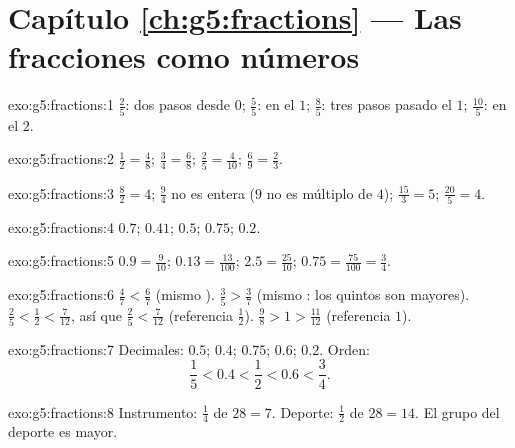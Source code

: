 \section*{Capítulo \ref{ch:g5:fractions} --- Las fracciones como números}

\begin{solution}{exo:g5:fractions:1}
$\frac25$: dos pasos desde $0$; $\frac55$: en el $1$; $\frac85$: tres
pasos pasado el $1$; $\frac{10}{5}$: en el $2$.
\end{solution}

\begin{solution}{exo:g5:fractions:2}
$\frac12 = \frac48$; \quad $\frac34 = \frac68$; \quad
$\frac25 = \frac{4}{10}$; \quad $\frac69 = \frac23$.
\end{solution}

\begin{solution}{exo:g5:fractions:3}
$\frac82 = 4$; \quad $\frac94$ no es entera ($9$ no es múltiplo
de $4$); \quad $\frac{15}{3} = 5$; \quad $\frac{20}{5} = 4$.
\end{solution}

\begin{solution}{exo:g5:fractions:4}
$0.7$; \quad $0.41$; \quad $0.5$; \quad $0.75$; \quad $0.2$.
\end{solution}

\begin{solution}{exo:g5:fractions:5}
$0.9 = \frac{9}{10}$; \quad $0.13 = \frac{13}{100}$; \quad
$2.5 = \frac{25}{10}$; \quad $0.75 = \frac{75}{100} = \frac34$.
\end{solution}

\begin{solution}{exo:g5:fractions:6}
$\frac47 < \frac67$ (mismo ). \quad
$\frac35 > \frac37$ (mismo : los quintos son mayores). \quad
$\frac25 < \frac12 < \frac{7}{12}$, así que $\frac25 < \frac{7}{12}$
(referencia $\frac12$). \quad
$\frac98 > 1 > \frac{11}{12}$ (referencia $1$).
\end{solution}

\begin{solution}{exo:g5:fractions:7}
Decimales: $0.5$; $0.4$; $0.75$; $0.6$; $0.2$. Orden:
\[
\frac15 < 0.4 < \frac12 < 0.6 < \frac34 .
\]
\end{solution}

\begin{solution}{exo:g5:fractions:8}
Instrumento: $\frac14$ de $28 = 7$. Deporte: $\frac12$ de $28 = 14$.
El grupo del deporte es mayor.
\end{solution}

